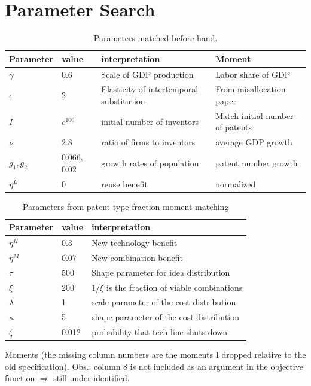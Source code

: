\documentclass[a4paper,11pt]{article}
\begin{document}
\section*{Parameter Search}


\begin{table}[h!]
\centering
\begin{tabular}{llp{5cm}p{5cm}}
\hline \hline
Parameter & value & interpretation & Moment\\ \hline
$\gamma$ & 0.6 & Scale of GDP production & Labor share of GDP \\
$\epsilon$ & 2& Elasticity of intertemporal substitution & From misallocation paper   \\
$I$ & $e^{100}$ & initial number of inventors &  Match initial number of patents\\
$\nu$ & 2.8 & ratio of firms to inventors & average GDP growth \\
$g_1, g_2$&0.066, 0.02 & growth rates of population & patent number growth\\
$\eta^L$& 0 & reuse benefit & normalized \\
\hline \hline
\end{tabular}
\caption{Parameters matched before-hand.}
\end{table}

\begin{table}[h!]
\centering
\begin{tabular}{lll}
\hline \hline
Parameter & value & interpretation \\ \hline
$\eta^H$ & 0.3 & New technology benefit \\
$\eta^M$ & 0.07 & New combination benefit \\
$\tau$ & 500 & Shape parameter for idea distribution \\
$\xi$ & 200 & $1/\xi$ is the fraction of viable combinations \\
$\lambda $ & 1 & scale parameter of the cost distribution \\
$\kappa $ & 5  & shape parameter of the cost distribution \\
$\zeta$ & 0.012 & probability that tech line shuts down \\
\hline \hline
\end{tabular}
\caption{Parameters from patent type fraction moment matching}
\end{table}


\begin{table}[h!]
\centering

\caption{Moments (the missing column numbers are the moments I dropped relative to the old specification). Obs.: column 8 is not included as an argument in the objective function $\Rightarrow$ still under-identified.}
\end{table}
\end{document}
